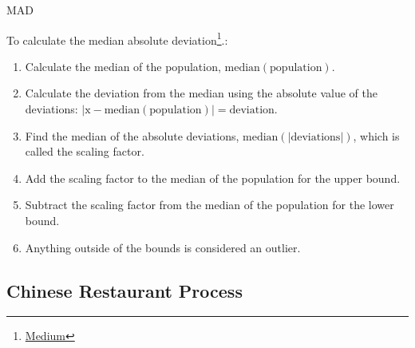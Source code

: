 \documentclass[xcolor={dvipsnames}]{beamer}
\begin{document}
\begin{frame}{MAD}

To calculate the median absolute deviation\footnote{\textcolor{blue}{\href{https://medium.com/@n.j.marey/outlier-detection-median-absolute-deviation-in-sas-971e07f95b67\#\string~:text\string=~:text\%3Dmedian\%20absolute\%20deviation\%20is\%20a\%2Cthe\%20mean\%20and\%20standard\%20deviation.}{Medium}}}.:

\begin{enumerate}
    \item Calculate the median of the population, $\text{median}(\text{population})$.
    \item Calculate the deviation from the median using the absolute value of the deviations: $|\text{x} - \text{median}(\text{population})| = \text{deviation}$.
    \item Find the median of the absolute deviations, $\text{median}(|\text{deviations}|)$, which is called the scaling factor.
    \item Add the scaling factor to the median of the population for the upper bound.
    \item Subtract the scaling factor from the median of the population for the lower bound.
    \item Anything outside of the bounds is considered an outlier.
\end{enumerate}
    
\end{frame}

\subsection{Chinese Restaurant Process}
\end{document}
